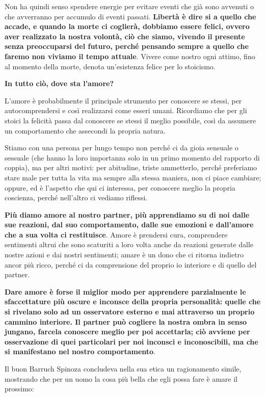 \documentclass[a4paper,12pt,oneside]{article}%
\begin{document}
Non ha quindi senso spendere energie per evitare eventi che già sono avvenuti o che avverranno per accumulo di eventi passati. \textbf{Libertà è dire si a quello che accade, e quando la morte ci coglierà, dobbiamo essere felici, ovvero aver realizzato la nostra volontà, ciò che siamo, vivendo il presente senza preoccuparsi del futuro, perché pensando sempre a quello che faremo non viviamo il tempo attuale}. Vivere come nostro ogni attimo, fino al momento della morte, denota un'esistenza felice per lo stoicismo.

\textbf{In tutto ciò, dove sta l'amore?}

L'amore è probabilmente il principale strumento per conoscere se stessi, per autocomprendersi e così realizzarsi come esseri umani. Ricordiamo che per gli stoici la felicità passa dal conoscere se stessi il meglio possibile, così da assumere un comportamento che assecondi la propria natura.

Stiamo con una persona per lungo tempo non perché ci da gioia sensuale o sessuale (che hanno la loro importanza solo in un primo momento del rapporto di coppia), ma per altri motivi: per abitudine, triste ammetterlo, perché preferiamo stare male per tutta la vita ma sempre alla stessa maniera, non ci piace cambiare; oppure, ed è l'aspetto che qui ci interessa, per conoscere meglio la propria coscienza, perché nell'altro ci vediamo riflessi.

\textbf{Più diamo amore al nostro partner, più apprendiamo su di noi dalle sue reazioni, dal suo comportamento, dalle sue emozioni e dall'amore che a sua volta ci restituisce}. Amore è prendersi cura, comprendere sentimenti altrui che sono scaturiti a loro volta anche da reazioni generate dalle nostre azioni e dai nostri sentimenti; amare è un dono che ci ritorna indietro ancor più ricco, perché ci da comprensione del proprio io interiore e di quello del partner.

\textbf{Dare amore è forse il miglior modo per apprendere parzialmente le sfaccettature più oscure e inconsce della propria personalità: quelle che si rivelano solo ad un osservatore esterno e mai attraverso un proprio cammino interiore. Il partner può cogliere la nostra ombra in senso jungano, farcela conoscere meglio per poi accettarla; ciò avviene per osservazione di quei particolari per noi inconsci e inconoscibili, ma che si manifestano nel nostro comportamento}.

Il buon Barruch Spinoza concludeva nella sua etica un ragionamento simile, mostrando che per un uomo la cosa più bella che egli possa fare è amare il prossimo:
\end{document}
